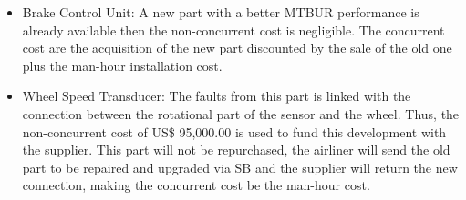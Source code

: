 \begin{itemize}
\item	Brake Control Unit: A new part with a better MTBUR performance is already available then the non-concurrent cost is negligible. The concurrent cost are the acquisition of the new part discounted by the sale of the old one plus the man-hour installation cost.
\item	Wheel Speed Transducer: The faults from this part is linked with the connection between the rotational part of the sensor and the wheel. Thus, the non-concurrent cost of US\$ 95,000.00 is used to fund this development with the supplier. This part will not be repurchased, the airliner will send the old part to be repaired and upgraded via SB and the supplier will return the new connection, making the concurrent cost be the man-hour cost.
\end{itemize}

